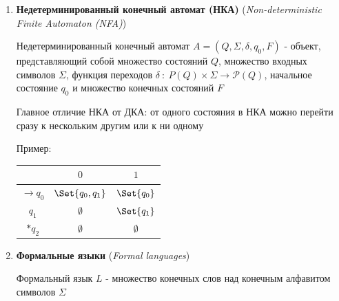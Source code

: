 \documentclass[12pt]{article}
\begin{document}
\begin{enumerate}
        \item \textbf{Недетерминированный конечный автомат (НКА)} (\textit{Non-deterministic Finite Automaton (NFA)})

        Недетерминированный конечный автомат $A = (Q, \Sigma, \delta, q_0, F)$ - объект, представляющий собой множество состояний $Q$, множество входных символов $\Sigma$,
        функция переходов $\delta \ : \ P(Q) \times \Sigma \to \mathcal{P}(Q)$, начальное состояние $q_0$ и множество конечных состояний $F$

        Главное отличие НКА от ДКА: от одного состояния в НКА можно перейти сразу к нескольким другим или к ни одному

        Пример:

        \begin{multicols}{2}

            \begin{tabular}{c|cc}
                & $0$              & $1$         \\
                \hline
                $\to q_0$ & $\Set{q_0, q_1}$ & $\Set{q_0}$ \\
                \hline
                $q_1$     & $\emptyset$      & $\Set{q_1}$ \\
                \hline
                $*q_2$    & $\emptyset$      & $\emptyset$
            \end{tabular}

        \end{multicols}

        \item \textbf{Формальные языки} (\textit{Formal languages})

        Формальный язык $L$ - множество конечных слов над конечным алфавитом символов $\Sigma$


\end{enumerate}
\end{document}
